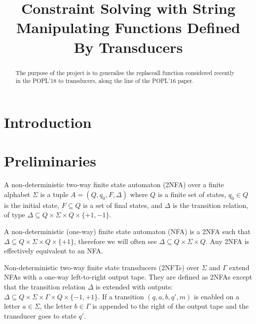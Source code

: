 \documentclass{llncs}
\begin{document}
 

\title{Constraint Solving with String Manipulating Functions Defined By Transducers}

\author{}
\institute{}



	
\maketitle
	
\begin{abstract}
	The purpose of the project is to generalise the replaceall function considered recently in the POPL'18 to transducers, along the line of the POPL'16 paper. 
\end{abstract}

 

\section{Introduction}

\section{Preliminaries}

\begin{definition}
A non-deterministic two-way finite state automaton 
(2NFA) over a finite alphabet $\Sigma$ is a tuple $A =
(Q, q_0, F, \Delta)$ where $Q$ is a finite set of states, $q_0\in Q$ is
the initial state, $F\subseteq Q$ is a set of final states, and $\Delta$ is the
transition relation, of type $\Delta\subseteq Q \times \Sigma\times Q \times \{+1, -1\}$. 

A non-deterministic (one-way) finite state automaton (NFA)
is a 2NFA such that $\Delta\subseteq Q \times \Sigma\times Q \times \{+1\}$, therefore we
will often see $\Delta\subseteq Q \times \Sigma \times Q$. Any 2NFA is
effectively equivalent to an NFA.  
\end{definition}


\begin{definition}
  Non-deterministic two-way finite state transducers (2NFTs) over $\Sigma$ and $\Gamma$ extend NFAs with a one-way left-to-right output tape. They are defined as 2NFAs except that the transition relation $\Delta$ is extended with outputs: $\Delta\subseteq Q \times \Sigma \times \Gamma \times  Q \times \{-1, +1\}$. If a transition $(q, a, b, q′, m)$ is enabled on a letter $a\in \Sigma$, the letter $b\in \Gamma$ is appended to the right of
	the output tape and the transducer goes to state $q'$. 
\end{definition}
\end{document}
